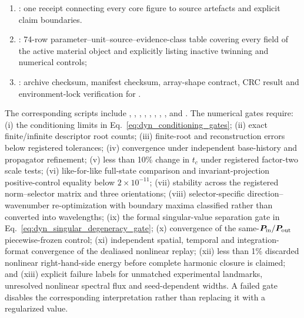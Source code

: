 \begin{enumerate}
\item {}: one receipt connecting every core figure to source artefacts and explicit claim boundaries.
\item {}: 74-row parameter--unit--source--evidence-class table covering every field of the active material object and explicitly listing inactive twinning and numerical controls;
\item {}: archive checksum, manifest checksum, array-shape contract, CRC result and environment-lock verification for .
\end{enumerate}

The corresponding scripts include , , , , , , , ,  and . The numerical gates require: (i) the conditioning limits in Eq.~\eqref{eq:dyn_conditioning_gates}; (ii) exact finite/infinite descriptor root counts; (iii) finite-root and reconstruction errors below registered tolerances; (iv) convergence under independent base-history and propagator refinement; (v) less than 10\% change in $t_c$ under registered factor-two scale tests; (vi) like-for-like full-state comparison and invariant-projection positive-control equality below $2\times10^{-11}$; (vii) stability across the registered norm--selector matrix and three orientations; (viii) selector-specific direction--wavenumber re-optimization with boundary maxima classified rather than converted into wavelengths; (ix) the formal singular-value separation gate in Eq.~\eqref{eq:dyn_singular_degeneracy_gate}; (x) convergence of the same-$\boldsymbol P_{\rm in}/\boldsymbol P_{\rm out}$ piecewise-frozen control; (xi) independent spatial, temporal and integration-format convergence of the dealiased nonlinear replay; (xii) less than 1\% discarded nonlinear right-hand-side energy before complete harmonic closure is claimed; and (xiii) explicit failure labels for unmatched experimental landmarks, unresolved nonlinear spectral flux and seed-dependent widths. A failed gate disables the corresponding interpretation rather than replacing it with a regularized value.

